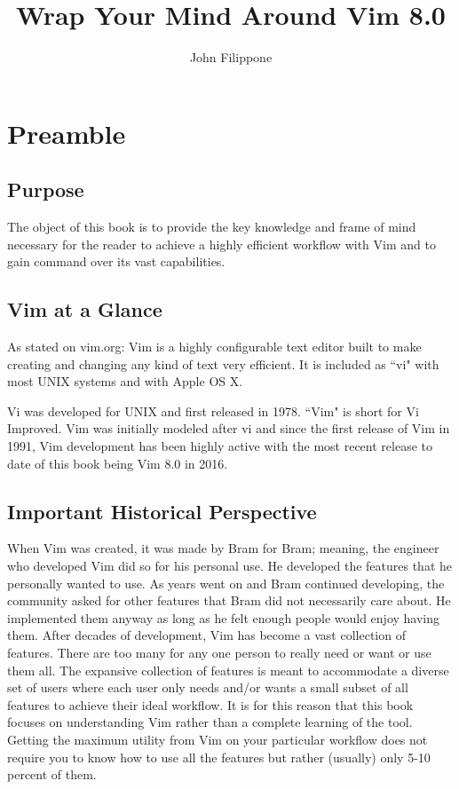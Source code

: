 \documentclass[12pt, oneside]{book}
\title{Wrap Your Mind Around Vim 8.0}
\author{John Filippone}
\begin{document}
\maketitle
\tableofcontents

\chapter{Preamble}
\section{Purpose}
The object of this book is to provide the key knowledge and frame of mind necessary for the reader to achieve a highly efficient workflow with Vim and to gain command over its vast capabilities.

\section{Vim at a Glance}
As stated on vim.org: Vim is a highly configurable text editor built to make creating and changing any kind of text very efficient. It is included as ``vi" with most UNIX systems and with Apple OS X.

\vspace{5mm}
Vi was developed for UNIX and first released in 1978.  ``Vim" is short for Vi Improved.  Vim was initially modeled after vi and since the first release of Vim in 1991, Vim development has been highly active with the most recent release to date of this book being Vim 8.0 in 2016.

\section{Important Historical Perspective}
When Vim was created, it was made by Bram for Bram; meaning, the engineer who developed Vim did so for his personal use.  He developed the features that he personally wanted to use.  As years went on
and Bram continued developing, the community asked for other features that Bram did not necessarily care about.  He implemented them anyway as long as he felt enough people would enjoy having them.
After decades of development, Vim has become a vast collection of features.  There are too many for any one person to really need or want or use them all.  The expansive collection of features is
meant to accommodate a diverse set of users where each user only needs and/or wants a small subset of all features to achieve their ideal workflow.  It is for this reason that this book focuses on
understanding Vim rather than a complete learning of the tool.  Getting the maximum utility from Vim on your particular workflow does not require you to know how to use all the features but rather
(usually) only 5-10 percent of them.
\end{document}
